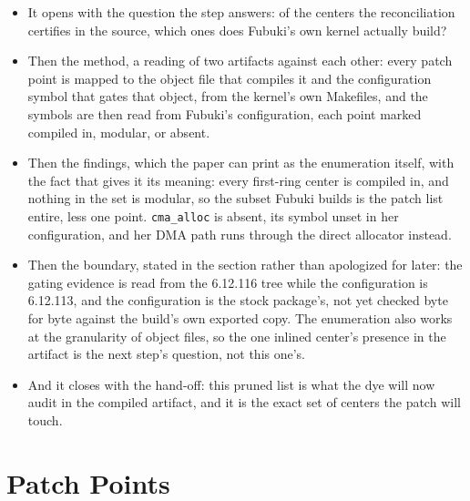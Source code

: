 \documentclass[11pt]{article}
\begin{document}
\begin{itemize}
\item It opens with the question the step answers: of the centers the reconciliation certifies in the source, which ones does Fubuki's own kernel actually build?
\item Then the method, a reading of two artifacts against each other: every patch point is mapped to the object file that compiles it and the configuration symbol that gates that object, from the kernel's own Makefiles, and the symbols are then read from Fubuki's configuration, each point marked compiled in, modular, or absent.
\item Then the findings, which the paper can print as the enumeration itself, with the fact that gives it its meaning: every first-ring center is compiled in, and nothing in the set is modular, so the subset Fubuki builds is the patch list entire, less one point. \texttt{cma\_alloc} is absent, its symbol unset in her configuration, and her DMA path runs through the direct allocator instead.
\item Then the boundary, stated in the section rather than apologized for later: the gating evidence is read from the 6.12.116 tree while the configuration is 6.12.113, and the configuration is the stock package's, not yet checked byte for byte against the build's own exported copy. The enumeration also works at the granularity of object files, so the one inlined center's presence in the artifact is the next step's question, not this one's.
\item And it closes with the hand-off: this pruned list is what the dye will now audit in the compiled artifact, and it is the exact set of centers the patch will touch.
\end{itemize}

\section{Patch Points}
\end{document}
